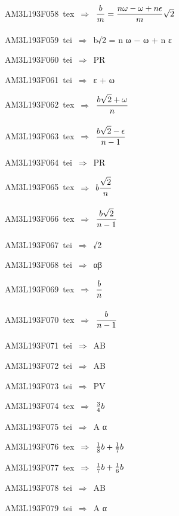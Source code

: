 {\sixrm AM3L193F058\ {\sixit tex}\ }$\Rightarrow$\ ${\displaystyle\strut b\over \displaystyle\strut m} = {\displaystyle\strut {n \omega   -  \omega   + n \epsilon  }\over \displaystyle\strut m}\sqrt{2}$\par\smallskip
{\sixrm AM3L193F059\ {\sixit tei}\ }$\Rightarrow$\ {\tenit b}√2 = {\tenit n} ω  −  ω  + {\tenit n} ε\par\smallskip
{\sixrm AM3L193F060\ {\sixit tei}\ }$\Rightarrow$\ PR\par\smallskip
{\sixrm AM3L193F061\ {\sixit tei}\ }$\Rightarrow$\ ε  +  ω\par\smallskip
{\sixrm AM3L193F062\ {\sixit tex}\ }$\Rightarrow$\ ${\displaystyle\strut {b\sqrt{2} +  \omega  }\over \displaystyle\strut n}$\par\smallskip
{\sixrm AM3L193F063\ {\sixit tex}\ }$\Rightarrow$\ ${\displaystyle\strut {b\sqrt{2} -  \epsilon  }\over \displaystyle\strut {n - 1}}$\par\smallskip
{\sixrm AM3L193F064\ {\sixit tei}\ }$\Rightarrow$\ PR\par\smallskip
{\sixrm AM3L193F065\ {\sixit tex}\ }$\Rightarrow$\ $b{\displaystyle\strut \sqrt{2}\over \displaystyle\strut n}$\par\smallskip
{\sixrm AM3L193F066\ {\sixit tex}\ }$\Rightarrow$\ ${\displaystyle\strut {b\sqrt{2}}\over \displaystyle\strut {n - 1}}$\par\smallskip
{\sixrm AM3L193F067\ {\sixit tei}\ }$\Rightarrow$\ √2\par\smallskip
{\sixrm AM3L193F068\ {\sixit tei}\ }$\Rightarrow$\ αβ\par\smallskip
{\sixrm AM3L193F069\ {\sixit tex}\ }$\Rightarrow$\ ${\displaystyle\strut b\over \displaystyle\strut n}$\par\smallskip
{\sixrm AM3L193F070\ {\sixit tex}\ }$\Rightarrow$\ ${\displaystyle\strut b\over \displaystyle\strut {n - 1}}$\par\smallskip
{\sixrm AM3L193F071\ {\sixit tei}\ }$\Rightarrow$\ AB\par\smallskip
{\sixrm AM3L193F072\ {\sixit tei}\ }$\Rightarrow$\ AB\par\smallskip
{\sixrm AM3L193F073\ {\sixit tei}\ }$\Rightarrow$\ PV\par\smallskip
{\sixrm AM3L193F074\ {\sixit tex}\ }$\Rightarrow$\ ${{3\over 4}}b$\par\smallskip
{\sixrm AM3L193F075\ {\sixit tei}\ }$\Rightarrow$\ A α\par\smallskip
{\sixrm AM3L193F076\ {\sixit tex}\ }$\Rightarrow$\ ${{1\over 8}}b + {{1\over 7}}b$\par\smallskip
{\sixrm AM3L193F077\ {\sixit tex}\ }$\Rightarrow$\ ${{1\over 7}}b + {{1\over 6}}b$\par\smallskip
{\sixrm AM3L193F078\ {\sixit tei}\ }$\Rightarrow$\ AB\par\smallskip
{\sixrm AM3L193F079\ {\sixit tei}\ }$\Rightarrow$\ A α\par\smallskip

